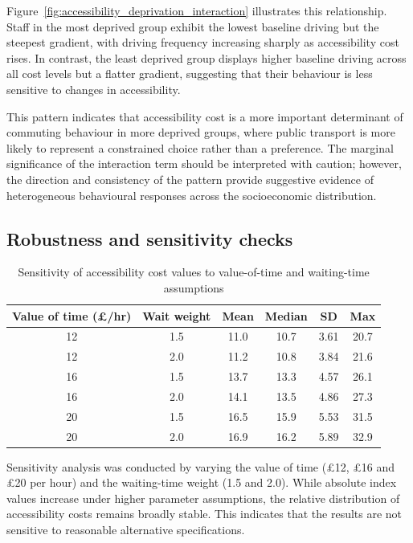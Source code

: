 \documentclass[11pt,a4paper]{article}
\begin{document}
Figure~\ref{fig:accessibility_deprivation_interaction} illustrates this relationship. Staff in the most deprived group exhibit the lowest baseline driving but the steepest gradient, with driving frequency increasing sharply as accessibility cost rises. In contrast, the least deprived group displays higher baseline driving across all cost levels but a flatter gradient, suggesting that their behaviour is less sensitive to changes in accessibility.

This pattern indicates that accessibility cost is a more important determinant of commuting behaviour in more deprived groups, where public transport is more likely to represent a constrained choice rather than a preference. The marginal significance of the interaction term should be interpreted with caution; however, the direction and consistency of the pattern provide suggestive evidence of heterogeneous behavioural responses across the socioeconomic distribution.

\subsection{Robustness and sensitivity checks}

\begin{table}[H]
\centering
\caption{Sensitivity of accessibility cost values to value-of-time and waiting-time assumptions}
\label{tab:sensitivity_checks}
\begin{tabular}{cccccc}
\hline
Value of time (\pounds/hr) & Wait weight & Mean & Median & SD & Max \\
\hline
12 & 1.5 & 11.0 & 10.7 & 3.61 & 20.7 \\
12 & 2.0 & 11.2 & 10.8 & 3.84 & 21.6 \\
16 & 1.5 & 13.7 & 13.3 & 4.57 & 26.1 \\
16 & 2.0 & 14.1 & 13.5 & 4.86 & 27.3 \\
20 & 1.5 & 16.5 & 15.9 & 5.53 & 31.5 \\
20 & 2.0 & 16.9 & 16.2 & 5.89 & 32.9 \\
\hline
\end{tabular}
\end{table}

Sensitivity analysis was conducted by varying the value of time (\pounds12, \pounds16 and \pounds20 per hour) and the waiting-time weight (1.5 and 2.0). While absolute index values increase under higher parameter assumptions, the relative distribution of accessibility costs remains broadly stable. This indicates that the results are not sensitive to reasonable alternative specifications.
\end{document}
